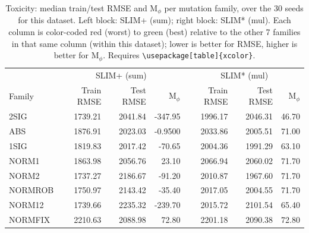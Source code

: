 \begin{table}[t]
\centering
\caption{Toxicity: median train/test RMSE and M$_\phi$ per mutation family, over the 30 seeds for this dataset. Left block: SLIM+ (sum); right block: SLIM* (mul). Each column is color-coded red (worst) to green (best) relative to the other 7 families in that same column (within this dataset); lower is better for RMSE, higher is better for M$_\phi$. Requires \texttt{\textbackslash usepackage[table]\{xcolor\}}.}
\label{tab:summary-median-performance-toxicity}
\begin{tabular}{lrrr|rrr}
\toprule
& \multicolumn{3}{c|}{SLIM+ (sum)} & \multicolumn{3}{c}{SLIM* (mul)} \\
Family & Train RMSE & Test RMSE & M$_\phi$ & Train RMSE & Test RMSE & M$_\phi$ \\
\midrule
2SIG & \cellcolor[HTML]{AFDBB0}1739.21 & \cellcolor[HTML]{C1E1AE}2041.84 & \cellcolor[HTML]{FAAAA5}-347.95 & \cellcolor[HTML]{AEDBB0}1996.17 & \cellcolor[HTML]{FEE9A6}2046.31 & \cellcolor[HTML]{FAAAA5}46.70 \\
ABS & \cellcolor[HTML]{DEEBAB}1876.91 & \cellcolor[HTML]{B3DCB0}2023.03 & \cellcolor[HTML]{CBE4AD}-0.9500 & \cellcolor[HTML]{CCE5AD}2033.86 & \cellcolor[HTML]{DCEAAB}2005.51 & \cellcolor[HTML]{BADFAF}71.00 \\
1SIG & \cellcolor[HTML]{CBE4AD}1819.83 & \cellcolor[HTML]{AEDBB0}2017.42 & \cellcolor[HTML]{E5EDAA}-70.65 & \cellcolor[HTML]{B5DDAF}2004.36 & \cellcolor[HTML]{CBE5AD}1991.29 & \cellcolor[HTML]{EAEFA9}63.10 \\
NORM1 & \cellcolor[HTML]{DAE9AB}1863.98 & \cellcolor[HTML]{CCE5AD}2056.76 & \cellcolor[HTML]{C1E1AE}23.10 & \cellcolor[HTML]{E6EEAA}2066.94 & \cellcolor[HTML]{FDD9A6}2060.02 & \cellcolor[HTML]{B5DDAF}71.70 \\
NORM2 & \cellcolor[HTML]{AEDBB0}1737.27 & \cellcolor[HTML]{FCCCA6}2186.67 & \cellcolor[HTML]{EDF0A9}-91.20 & \cellcolor[HTML]{BADFAF}2010.87 & \cellcolor[HTML]{AEDBB0}1967.60 & \cellcolor[HTML]{B5DDAF}71.70 \\
NORMROB & \cellcolor[HTML]{B3DDB0}1750.97 & \cellcolor[HTML]{FEEAA6}2143.42 & \cellcolor[HTML]{D8E9AB}-35.40 & \cellcolor[HTML]{BFE0AE}2017.05 & \cellcolor[HTML]{DBEAAB}2004.55 & \cellcolor[HTML]{B5DDAF}71.70 \\
NORM12 & \cellcolor[HTML]{AFDBB0}1739.66 & \cellcolor[HTML]{FAAAA5}2235.32 & \cellcolor[HTML]{FDD1A6}-239.70 & \cellcolor[HTML]{BEE0AE}2015.72 & \cellcolor[HTML]{FAAAA5}2101.54 & \cellcolor[HTML]{DCEAAB}65.40 \\
NORMFIX & \cellcolor[HTML]{FAAAA5}2210.63 & \cellcolor[HTML]{E3EDAA}2088.98 & \cellcolor[HTML]{AEDBB0}72.80 & \cellcolor[HTML]{FAAAA5}2201.18 & \cellcolor[HTML]{FBB7A5}2090.38 & \cellcolor[HTML]{AEDBB0}72.80 \\
\bottomrule
\end{tabular}
\end{table}
